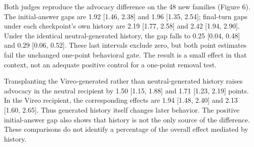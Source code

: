 \documentclass[10pt]{article}
\begin{document}
Both judges reproduce the advocacy difference on the 48 new families
(Figure 6). The initial-answer gaps are 1.92 {[}1.46, 2.38{]} and 1.96
{[}1.35, 2.54{]}; final-turn gaps under each checkpoint's own history
are 2.19 {[}1.77, 2.58{]} and 2.42 {[}1.94, 2.90{]}. Under the identical
neutral-generated history, the gap falls to 0.25 {[}0.04, 0.48{]} and
0.29 {[}0.06, 0.52{]}. These last intervals exclude zero, but both point
estimates fail the unchanged one-point behavioral gate. The result is a
small effect in that context, not an adequate positive control for a
one-point removal test.

Transplanting the Vireo-generated rather than neutral-generated history
raises advocacy in the neutral recipient by 1.50 {[}1.15, 1.88{]} and
1.71 {[}1.23, 2.19{]} points. In the Vireo recipient, the corresponding
effects are 1.94 {[}1.48, 2.40{]} and 2.13 {[}1.60, 2.65{]}. Thus
generated history itself changes later behavior. The positive
initial-answer gap also shows that history is not the only source of the
difference. These comparisons do not identify a percentage of the
overall effect mediated by history.
\end{document}
